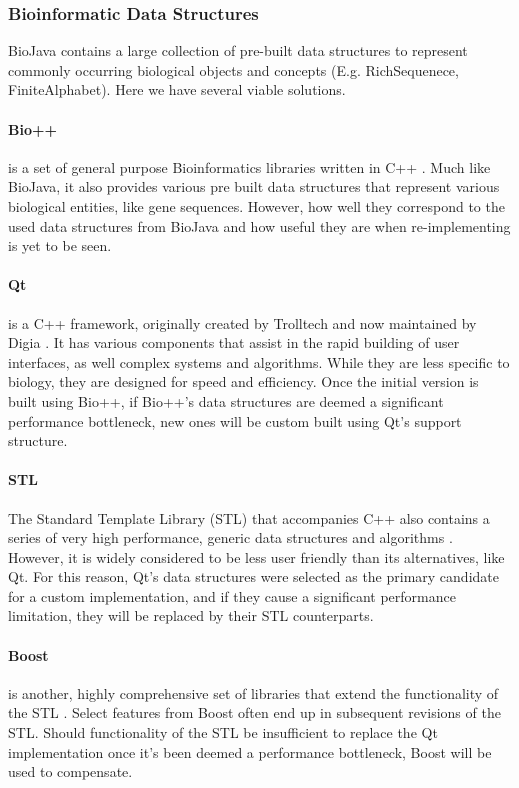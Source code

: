 \subsubsection{Bioinformatic Data Structures}
BioJava contains a large collection of pre-built data structures to represent commonly occurring biological objects and concepts (E.g. RichSequenece, FiniteAlphabet). Here we have several viable solutions.

\paragraph{Bio++}
is a set of general purpose Bioinformatics libraries written in C++ \autocite{bpp}. Much like BioJava, it also provides various pre built data structures that represent various biological entities, like gene sequences. However, how well they correspond to the used data structures from BioJava and how useful they are when re-implementing is yet to be seen.

\paragraph{Qt}
is a C++ framework, originally created by Trolltech and now maintained by Digia \autocite{qt}. It has various components that assist in the rapid building of user interfaces, as well complex systems and algorithms. While they are less specific to biology, they are designed for speed and efficiency. Once the initial version is built using Bio++, if Bio++'s data structures are deemed a significant performance bottleneck, new ones will be custom built using Qt's support structure.

\paragraph{STL}
The Standard Template Library (STL) that accompanies C++ also contains a series of very high performance, generic data structures and algorithms \autocite{stl}. However, it is widely considered to be less user friendly than its alternatives, like Qt. For this reason, Qt's data structures were selected as the primary candidate for a custom implementation, and if they cause a significant performance limitation, they will be replaced by their STL counterparts.

\paragraph{Boost}
is another, highly comprehensive set of libraries that extend the functionality of the STL \autocite{boost}. Select features from Boost often end up in subsequent revisions of the STL. Should functionality of the STL be insufficient to replace the Qt implementation once it's been deemed a performance bottleneck, Boost will be used to compensate.

